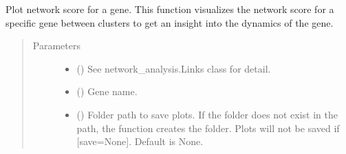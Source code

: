 \documentclass[letterpaper,10pt,english]{sphinxmanual}
\begin{document}
\begin{fulllineitems}
\begin{fulllineitems}
\begin{quote}
\begin{description}
\begin{itemize}
\end{itemize}

\end{description}\end{quote}

\end{fulllineitems}


\begin{fulllineitems}
\label{\detokenize{modules/celloracle:celloracle.Links.plot_score_per_cluster}}
Plot network score for a gene.
This function visualizes the network score for a specific gene between clusters to get an insight into the dynamics of the gene.
\begin{quote}\begin{description}
\item[{Parameters}] \leavevmode\begin{itemize}
\item {} 
 ({\hyperref[\detokenize{modules/celloracle:celloracle.Links}]{}}) \textendash{} See network\_analysis.Links class for detail.

\item {} 
 () \textendash{} Gene name.

\item {} 
 () \textendash{} Folder path to save plots. If the folder does not exist in the path, the function creates the folder.
Plots will not be saved if {[}save=None{]}. Default is None.

\end{itemize}

\end{description}\end{quote}

\end{fulllineitems}



\end{fulllineitems}
\end{document}
